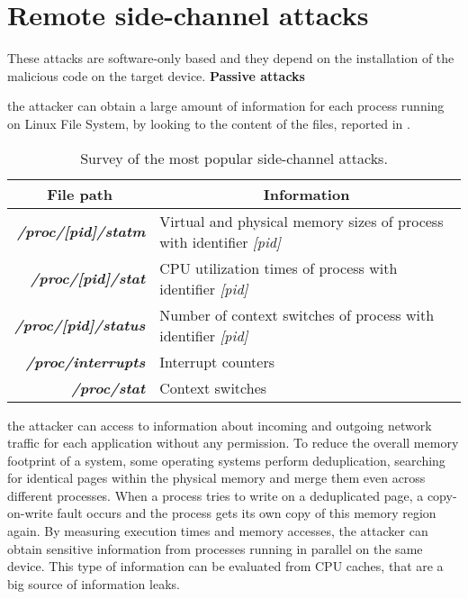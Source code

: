 \section{Remote side-channel attacks}
These attacks are software-only based and they depend on the installation of the malicious code on the target device. 
\textbf{Passive attacks}
\begin{itemize}
{the attacker can obtain a large amount of information for each process running on Linux File System, by looking to the content of the files, reported in .
\begin{table}[h]
\centering \footnotesize
\renewcommand*\arraystretch{1.3}
\begin{tabular}{rl}
\toprule
\multicolumn{1}{c}{\textbf{File path}} & \multicolumn{1}{c}{\textbf{Information}}\\
\midrule
{\textbf{\textit{/proc/[pid]/statm}}} & {Virtual and physical memory sizes of process with identifier \textit{[pid]}}\\
{\textbf{\textit{/proc/[pid]/stat}}} & {CPU utilization times of process with identifier \textit{[pid]}}\\
{\textbf{\textit{/proc/[pid]/status}}} & {Number of context switches of process with identifier \textit{[pid]}}\\
{\textbf{\textit{/proc/interrupts}}} & {Interrupt counters}\\
{\textbf{\textit{/proc/stat}}} & {Context switches}\\
\bottomrule
\end{tabular}
\caption{\footnotesize{Survey of the most popular side-channel attacks\cite{side_classification}.}}
\label{sc:proc}
\end{table}
}
{the attacker can access to information about incoming and outgoing network traffic for each application without any permission.}
{To reduce the overall memory footprint of a system, some operating systems perform deduplication, searching for identical pages within the physical memory and merge them even across different processes. When a process tries to write on a deduplicated page, a copy-on-write fault occurs and the process gets its own copy of this memory region again.}
{By measuring execution times and memory accesses, the attacker can obtain sensitive information from processes running in parallel on the same device. This type of information can be evaluated from CPU caches, that are a big source of information leaks.}

\end{itemize}
